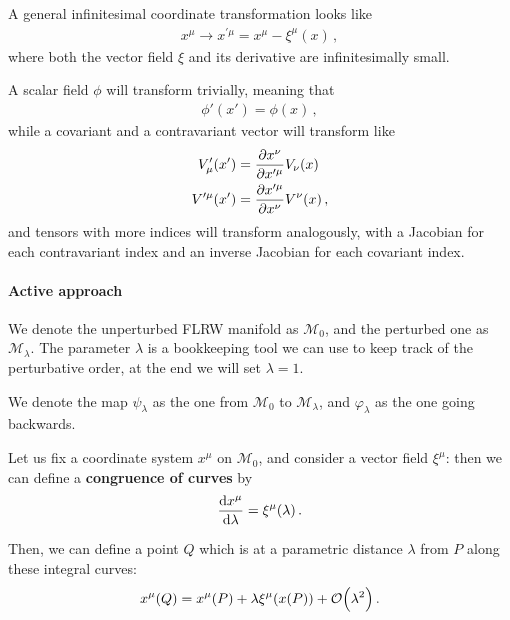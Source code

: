 \documentclass[main.tex]{subfiles}
\begin{document}

A general infinitesimal coordinate transformation looks like 
%
\begin{align}
x^{\mu } \to x^{\prime \mu } = x^{\mu } - \xi^{\mu }(x)
\,,
\end{align}
%
where both the vector field \(\xi \) and its derivative are infinitesimally small. 

A scalar field \(\phi \) will transform trivially, meaning that 
%
\begin{align}
\phi' (x') = \phi (x)
\,,
\end{align}
%
while a covariant and a contravariant vector will transform like 
%
\begin{align}
V^{\prime }_\mu (x') &= \pdv{x^{\nu }}{x^{\prime \mu }} V_\nu (x)  \\
V^{\prime \mu } (x') &= \pdv{x^{\prime \mu }}{x^{\nu }} V^{\nu }(x)
\,,
\end{align}
%
and tensors with more indices will transform analogously, with a Jacobian for each contravariant index and an inverse Jacobian for each covariant index. 

\paragraph{Active approach}

We denote the unperturbed FLRW manifold as \(\mathcal{M}_0\), and the perturbed one as \(\mathcal{M}_\lambda \). 
The parameter \(\lambda \) is a bookkeeping tool we can use to keep track of the perturbative order, at the end we will set \(\lambda = 1\). 

We denote the map \(\psi _\lambda \) as the one from \(\mathcal{M}_0\) to \(\mathcal{M}_\lambda \), and \(\varphi _\lambda \) as the one going backwards.  


Let us fix a coordinate system \(x^{\mu }\) on \(\mathcal{M}_0\), and consider a vector field \(\xi^{\mu }\): then we can define a \textbf{congruence of curves} by 
%
\begin{align}
\dv{x^{\mu }}{\lambda } = \xi^{\mu } (\lambda )
\,.
\end{align}

Then, we can define a point \(Q\) which is at a parametric distance \(\lambda \) from \(P\) along these integral curves: 
%
\begin{align} \label{eq:infinitesimal-point-transformation-active-approach}
x^{\mu } (Q) = x^{\mu } (P) + \lambda \xi ^{\mu } (x(P)) + \order{\lambda^2}
\,.
\end{align}
\end{document}
